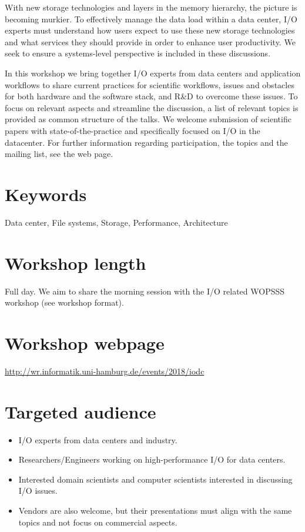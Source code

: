 \documentclass[a4paper,10pt]{article}
\begin{document}
With new storage technologies and layers in the memory hierarchy, the picture is becoming murkier.
To effectively manage the data load within a data center, I/O experts must understand how users expect to use these new storage technologies and what services they should provide in order to enhance user productivity. We seek to ensure a systems-level perspective is included in these discussions.

In this workshop we bring together I/O experts from data centers and application workflows to share current practices for scientific workflows, issues and obstacles for both hardware and the software stack, and R\&D to overcome these issues.
To focus on relevant aspects and streamline the discussion, a list of relevant topics is provided as common structure of the talks.
We welcome submission of scientific papers with state-of-the-practice and specifically focused on I/O in the datacenter.
For further information regarding participation, the topics and the mailing list, see the web page.

\section{Keywords}
Data center, File systems, Storage, Performance, Architecture

\section{Workshop length}
Full day.
We aim to share the morning session with the I/O related WOPSSS workshop (see workshop format).

\section{Workshop webpage}
\url{http://wr.informatik.uni-hamburg.de/events/2018/iodc}


\section{Targeted audience}
\begin{itemize}
\item I/O experts from data centers and industry.
\item Researchers/Engineers working on high-performance I/O for data centers.
\item Interested domain scientists and computer scientists interested in discussing I/O issues.
\item Vendors are also welcome, but their presentations must align with the same topics and not focus on commercial aspects.
\end{itemize}
\end{document}
